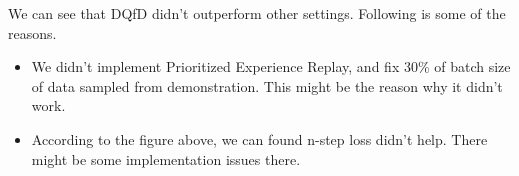 \documentclass[a0,portrait]{a0poster}
\begin{document}
\begin{multicols}{2}
We can see that DQfD didn't outperform other settings. Following is some of the reasons.

\begin{itemize}
\item We didn't implement Prioritized Experience Replay, and fix 30\% of batch size of data sampled from demonstration. This might be the reason why it didn't work.
\item According to the figure above, we can found n-step loss didn't help. There might be some implementation issues there.
\end{itemize}


\color{DarkSlateGray} %

\nocite{*} %


\end{multicols}
\end{document}
